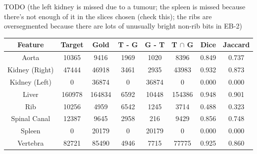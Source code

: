 TODO (the left kidney is missed due to a tumour; the spleen is missed because there's not enough of it in the slices chosen (check this); the ribs are oversegmented because there are lots of unusually bright non-rib bits in EB-2)

\begin{center}
\begin{tabular}{cccccccc}
\scriptsize \textbf{Feature} & \scriptsize \textbf{Target} & \scriptsize \textbf{Gold} & \scriptsize \textbf{T - G} & \scriptsize \textbf{G - T} & \scriptsize \textbf{T $\cap$ G} & \scriptsize \textbf{Dice} & \scriptsize \textbf{Jaccard} \\
\hline
\scriptsize Aorta & \scriptsize 10365 & \scriptsize 9416 & \scriptsize 1969 & \scriptsize 1020 & \scriptsize 8396 & \scriptsize 0.849 & \scriptsize 0.737 \\
\scriptsize Kidney (Right) & \scriptsize 47444 & \scriptsize 46918 & \scriptsize 3461 & \scriptsize 2935 & \scriptsize 43983 & \scriptsize 0.932 & \scriptsize 0.873 \\
\scriptsize Kidney (Left) & \scriptsize 0 & \scriptsize 36874 & \scriptsize 0 & \scriptsize 36874 & \scriptsize 0 & \scriptsize 0.000 & \scriptsize 0.000 \\
\scriptsize Liver & \scriptsize 160978 & \scriptsize 164834 & \scriptsize 6592 & \scriptsize 10448 & \scriptsize 154386 & \scriptsize 0.948 & \scriptsize 0.901 \\
\scriptsize Rib & \scriptsize 10256 & \scriptsize 4959 & \scriptsize 6542 & \scriptsize 1245 & \scriptsize 3714 & \scriptsize 0.488 & \scriptsize 0.323 \\
\scriptsize Spinal Canal & \scriptsize 12387 & \scriptsize 9645 & \scriptsize 2958 & \scriptsize 216 & \scriptsize 9429 & \scriptsize 0.856 & \scriptsize 0.748 \\
\scriptsize Spleen & \scriptsize 0 & \scriptsize 20179 & \scriptsize 0 & \scriptsize 20179 & \scriptsize 0 & \scriptsize 0.000 & \scriptsize 0.000 \\
\scriptsize Vertebra & \scriptsize 82721 & \scriptsize 85490 & \scriptsize 4946 & \scriptsize 7715 & \scriptsize 77775 & \scriptsize 0.925 & \scriptsize 0.860 \\
\end{tabular}
\end{center}

